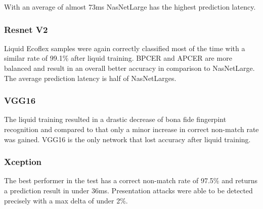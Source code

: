 With an average of almost 73ms NasNetLarge has the highest prediction latency.



\vspace{-1cm}
\subsubsection{Resnet V2}
Liquid Ecoflex samples were again correctly classified most of the time with a similar rate of 99.1\% after liquid training.
BPCER and APCER are more balanced and result in an overall better accuracy in comparison to NasNetLarge.
The average prediction latency is half of NasNetLarges.



\vspace{-1cm}
\subsubsection{VGG16}
The liquid training resulted in a drastic decrease of bona fide fingerpint recognition and compared to that only a minor increase in correct non-match rate was gained.
VGG16 is the only network that lost accuracy after liquid training.


\vfill
\vspace{-1cm}
\subsubsection{Xception}
The best performer in the test has a correct non-match rate of 97.5\% and returns a prediction result in under 36ms.
Presentation attacks were able to be detected precisely with a max delta of under 2\%.





\endinput





\subsubsection{EfficientNet B0}

The only BPCER over 90\% is achieved by EfficientNet B0 which is the second best performer over all.
Bona fide fingerprints were correctly detected with an accuracy of 92.5\%.

\predictiontables{efficientnet}



